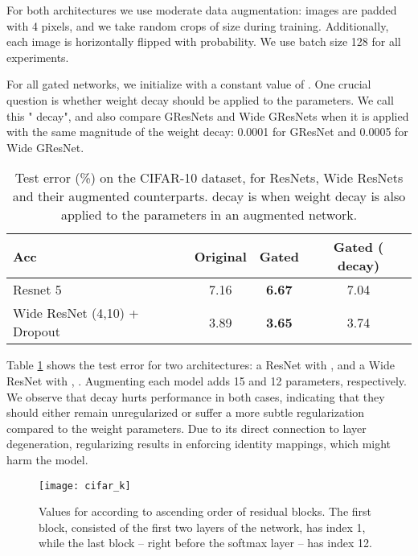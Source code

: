 \documentclass{article} \RequirePackage{amsmath,amsthm,amsfonts,amssymb}
\begin{document}
For both architectures we use moderate data augmentation: images are padded with 4 pixels, and we take random  crops of size  during training. Additionally, each image is horizontally flipped with    probability. We use batch size 128 for all experiments.

For all gated networks, we initialize  with a constant value of . One crucial question is whether weight decay should be applied to the  parameters. We call this " decay", and also compare GResNets and Wide GResNets when it is applied with the same magnitude of the weight decay: 0.0001 for GResNet and 0.0005 for Wide GResNet.

\begin{table}[h!]
\centering
    \begin{tabular}{ | l | c | c | c |}
    \hline
    Acc    & 		  Original & Gated & Gated ( decay)  \\ \hline
    Resnet 5 & 		7.16 & 	\textbf{6.67} &    7.04\\ \hline
Wide ResNet (4,10) + Dropout &  3.89 & 	\textbf{3.65}   & 3.74 \\ \hline
    \end{tabular}
\caption{Test error (\%) on the CIFAR-10 dataset, for ResNets, Wide ResNets and their augmented counterparts.  decay is when weight decay is also applied to the  parameters in an augmented network.}
    \label{cifar_comp}   
\end{table}


Table \ref{cifar_comp} shows the test error for two architectures: a ResNet with , and a Wide ResNet with , . Augmenting each model adds 15 and 12 parameters, respectively. We observe that  decay hurts performance in both cases, indicating that they should either remain unregularized or suffer a more subtle regularization compared to the weight parameters. Due to its direct connection to layer degeneration, regularizing  results in enforcing identity mappings, which might harm the model.




\begin{figure}[!ht]
  \centering
    \texttt{[image: cifar\_k]}
  \caption{Values for  according to ascending order of residual blocks. The first block, consisted of the first two layers of the network, has index 1, while the last block -- right before the softmax layer -- has index 12.}
\label{cpruning}
\end{figure}
\end{document}
